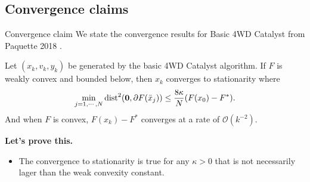 \documentclass[11pt]{beamer}
\begin{document}
    \subsection{Convergence claims}
        \begin{frame}{Convergence claim}
            We state the convergence results for Basic 4WD Catalyst from Paquette 2018 \cite{paquette_catalyst_2018}. 
            \begin{theorem}
                Let $(x_k, v_k, y_k)$ be generated by the basic 4WD Catalyst algorithm. 
                If $F$ is weakly convex and bounded below, then $x_k$ converges to stationarity where
                \begin{align*}
                    \min_{j = 1, \cdots, N} \operatorname{dist}^2(\mathbf 0, \partial F(\bar x_j))
                    \le \frac{8 \kappa}{N}(F(x_0) - F^*). 
                \end{align*}
                And when $F$ is convex, $F(x_k) - F^*$ converges at a rate of $\mathcal O(k^{-2})$. 
            \end{theorem}
            \pause
            \textbf{Let's prove this.} 
            \begin{itemize}
                \item The convergence to stationarity is true for any $\kappa > 0$ that is not necessarily lager than the weak convexity constant. 
            \end{itemize}
        \end{frame}
\end{document}
